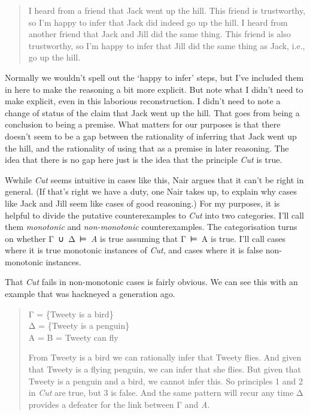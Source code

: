 \documentclass[
  10pt,
  letterpaper,
  twoside]{scrbook}
\begin{document}
\begin{quote}
I heard from a friend that Jack went up the hill. This friend is
trustworthy, so I'm happy to infer that Jack did indeed go up the hill.
I heard from another friend that Jack and Jill did the same thing. This
friend is also trustworthy, so I'm happy to infer that Jill did the same
thing as Jack, i.e., go up the hill.
\end{quote}

Normally we wouldn't spell out the `happy to infer' steps, but I've
included them in here to make the reasoning a bit more explicit. But
note what I didn't need to make explicit, even in this laborious
reconstruction. I didn't need to note a change of status of the claim
that Jack went up the hill. That goes from being a conclusion to being a
premise. What matters for our purposes is that there doesn't seem to be
a gap between the rationality of inferring that Jack went up the hill,
and the rationality of using that as a premise in later reasoning. The
idea that there is no gap here just is the idea that the principle
\emph{Cut} is true.

Wwhile \emph{Cut} seems intuitive in cases like this, Nair argues that
it can't be right in general. (If that's right we have a duty, one Nair
takes up, to explain why cases like Jack and Jill seem like cases of
good reasoning.) For my purposes, it is helpful to divide the putative
counterexamples to \emph{Cut} into two categories. I'll call them
\emph{monotonic} and \emph{non-monotonic} counterexamples. The
categorisation turns on whether Γ~∪~Δ~⊨~\emph{A} is true assuming that
Γ~⊨~A is true. I'll call cases where it is true monotonic instances of
\emph{Cut}, and cases where it is false non-monotonic instances.

That \emph{Cut} fails in non-monotonic cases is fairly obvious. We can
see this with an example that was hackneyed a generation ago.

\begin{quote}
Γ = \{Tweety is a bird\}\\
Δ = \{Tweety is a penguin\}\\
A = B = Tweety can fly

From Tweety is a bird we can rationally infer that Tweety flies. And
given that Tweety is a flying penguin, we can infer that she flies. But
given that Tweety is a penguin and a bird, we cannot infer this. So
principles 1 and 2 in \emph{Cut} are true, but 3 is false. And the same
pattern will recur any time Δ provides a defeater for the link between Γ
and \emph{A}.
\end{quote}
\end{document}
